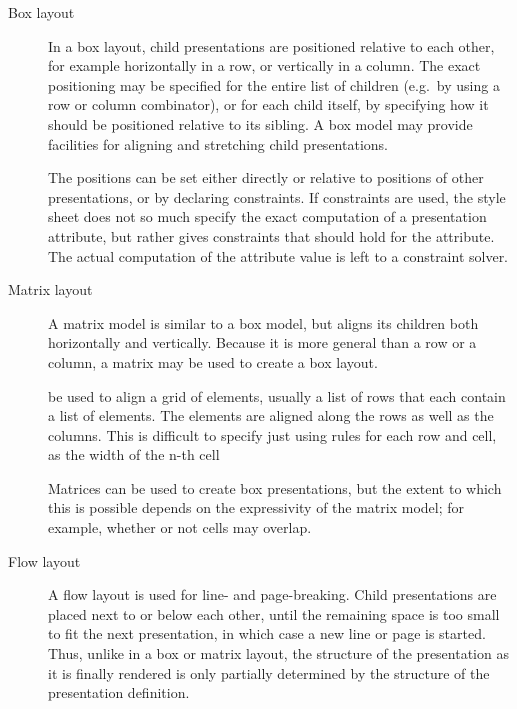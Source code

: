 \begin{description}
\item[Box layout]
In a box layout, child presentations are positioned relative to each other, for example horizontally in a row, or vertically in a column. The exact positioning may be specified for the entire list of children (e.g.\ by using a row or column combinator), or for each child itself, by specifying how it should be positioned relative to its sibling. A box model may provide facilities for aligning and stretching child presentations.

\bc The positions can be set either directly or relative to positions of other presentations, or by declaring constraints. If constraints are used, the style sheet does not so much specify the exact computation of a presentation attribute, but rather gives constraints that should hold for the attribute. The actual computation of the attribute value is left to a constraint solver. \ec
\item[Matrix layout]
A matrix model is similar to a box model, but aligns its children both horizontally and vertically. Because it is more general than a row or a column, a matrix may be used to create a box layout. 

\bc  be used to align a grid of elements, usually a list of rows that each contain a list of elements. The elements are aligned along the rows as well as the columns. This is difficult to specify just using rules for each row and cell, as the width of the n-th cell %

Matrices can be used to create box presentations, but the extent to which this is possible depends on the expressivity of the matrix model; for example, whether or not cells may overlap.
\ec

\item[Flow layout]

A flow layout is used for line- and page-breaking. Child presentations are placed next to or below each other, until the remaining space is too small to fit the next presentation, in which case a new line or page is started. Thus, unlike in a box or matrix layout, the structure of the presentation as it is finally rendered is only partially determined by the structure of the presentation definition.

%
\end{description}


